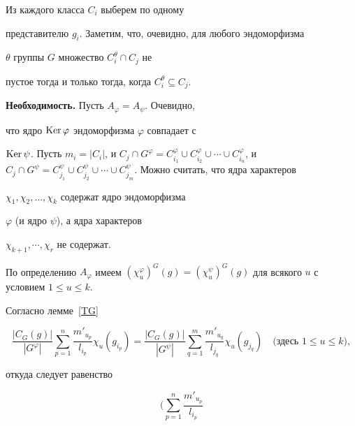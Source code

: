 \begin{pf} Из каждого класса $C_{i}$ выберем по одному


представителю $g_{i}$. Заметим, что, очевидно, для любого эндоморфизма


$\theta$ группы $G$ множество $C^{\theta}_{i}\cap C_{j}$ не


пустое тогда и только тогда, когда $C^{\theta}_{i}\subseteq C_{j}$.





{\bf Необходимость.} Пусть $A_{\varphi}=A_{\psi}$. Очевидно,


что ядро $\operatorname{Ker}\varphi$ эндоморфизма $\varphi$ совпадает с


$\Ker\psi$. Пусть $m_{i}=|C_{i}|$, и $C_{j}\cap


G^{\varphi}=C^{\varphi}_{i_{1}}\cup C^{\varphi}_{i_{2}}\cup \dotsb


\cup C^{\varphi}_{i_{n}}$, и $C_{j}\cap G^{\psi}=


C^{\psi}_{j_{1}}\cup C^{\psi}_{j_{2}}\cup\dotsb\cup


C^{\psi}_{j_{m}}$. Можно считать, что ядра характеров


$\chi_{1},\chi_{2},\dotsc,\chi_{k}$ содержат ядро эндоморфизма


$\varphi$ (и ядро $\psi$), а ядра характеров


$\chi_{k+1},\dotsb,\chi_{r}$ не содержат.





По определению $A_{\varphi}$ имеем $(\chi^{\varphi}_{u})^{G}(g)=


(\chi^{\psi}_{u})^{G}(g)$ для всякого $u$ с условием $1\le u\le k$.


Согласно лемме~\ref{TG}


$$


\frac{|C_{G}(g)|}{|G^{\varphi}|} \sum\limits^{n}_{p=1}


\frac{m'_{u_{p}}}{l_{i_{p}}} \chi_{u}(g_{i_{p}})=


\frac{|C_{G}(g)|}{|G^{\psi}|}


\sum\limits^{m}_{q=1}\frac{m'_{u_{q}}}{l_{j_{q}}} \chi_{u}(g_{j_{q}})


\quad\text{(здесь $1\le u\le k$)},


$$


откуда следует равенство


\begin{equation}\label{SLU}


\bigg(\sum\limits^{n}_{p=1}\frac{m'_{u_{p}}}{l_{i_{p}}}



\end{equation}
\end{pf}
